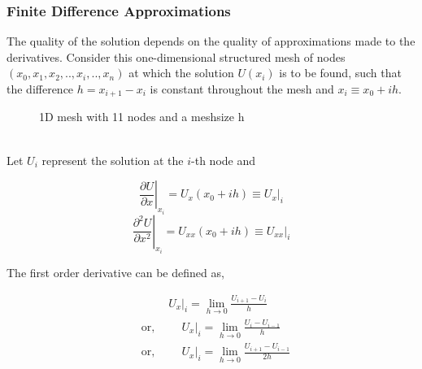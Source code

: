 \subsubsection{Finite Difference Approximations}
The quality of the solution depends on the quality of approximations made to the derivatives.
Consider this one-dimensional structured mesh of nodes $(x_0,x_1,x_2,..,x_i,..,x_n)$ at which the solution $U(x_i)$  is to be found, such that the difference $h = x_{i+1} - x_i $ is constant throughout the mesh and $x_i \equiv x_0 + ih$.\\
\begin{figure}[h]
\centering


\caption{\small 1D mesh with 11 nodes and a meshsize h}
\end{figure}
\\
Let $U_i$ represent the solution at the $i$-th node and \hfill
{}
\begin{equation*}
    \left. \frac{\partial U}{\partial x} \right|_{x_ i} = U_{x}(x_0 + ih) \equiv U_{x}|_i
\end{equation*} 
\begin{equation*}
    \left. \frac{\partial^2 U}{\partial x^2} \right|_{x_ i} = U_{xx}(x_0 + ih) \equiv U_{xx}|_i
\end{equation*}

The first order derivative can be defined as,
{\raggedright 
\begin{align*}
    &\text{} \hspace{1cm} U_x|_i = \lim_{h \to 0} \frac{U_{i+1} - U_i}{h}  \\
    &\text{or,} \hspace{1cm} U_x|_i = \lim_{h \to 0} \frac{U_{i} - U_{i-1}}{h}  \\
    &\text{or,} \hspace{1cm} U_x|_i = \lim_{h \to 0} \frac{U_{i+1} - U_{i-1}}{2h}  
\end{align*}
}

